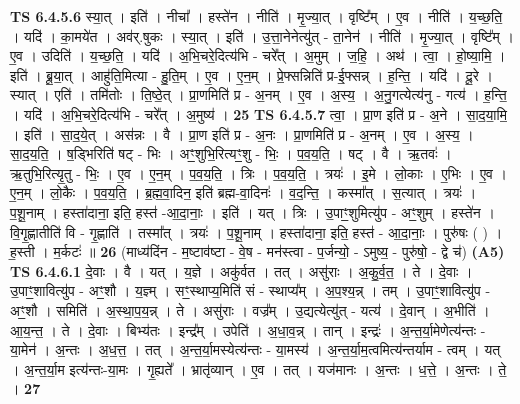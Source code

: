 \documentclass[17pt]{extarticle}
\begin{document}
                  \newline
                                \textbf{ TS 6.4.5.6} \newline
                  स्या॒त् । इति॑ । नीचा᳚ । हस्ते॑न । नीति॑ । मृ॒ज्या॒त् । वृष्टि᳚म् । ए॒व । नीति॑ । य॒च्छ॒ति॒ । यदि॑ । का॒मये॑त । अव॑र्.षुकः । स्या॒त् । इति॑ । उ॒त्ता॒नेनेत्यु॑त् - ता॒नेन॑ । नीति॑ । मृ॒ज्या॒त् । वृष्टि᳚म् । ए॒व । उदिति॑ । य॒च्छ॒ति॒ । यदि॑ । अ॒भि॒चरे॒दित्य॑भि - चरे᳚त् । अ॒मुम् । ज॒हि॒ । अथ॑ । त्वा॒ । हो॒ष्या॒मि॒ । इति॑ । ब्रू॒या॒त् । आहु॑ति॒मित्या - हु॒ति॒म् । ए॒व । ए॒न॒म् । प्रे॒फ्सन्निति॑ प्र-ई॒फ्सन्न् । ह॒न्ति॒ । यदि॑ । दू॒रे । स्यात् । एति॑ । तमि॑तोः । ति॒ष्ठे॒त् । प्रा॒णमिति॑ प्र - अ॒नम् । ए॒व । अ॒स्य॒ । अ॒नु॒गत्येत्य॑नु - गत्य॑ । ह॒न्ति॒ । यदि॑ । अ॒भि॒चरे॒दित्य॑भि - चरे᳚त् । अ॒मुष्य॑ । \textbf{  25} \newline
                  \newline
                                \textbf{ TS 6.4.5.7} \newline
                  त्वा॒ । प्रा॒ण इति॑ प्र - अ॒ने । सा॒द॒या॒मि॒ । इति॑ । सा॒द॒ये॒त् । अस॑न्नः । वै । प्रा॒ण इति॑ प्र - अ॒नः । प्रा॒णमिति॑ प्र - अ॒नम् । ए॒व । अ॒स्य॒ । सा॒द॒य॒ति॒ । ष॒ड्भिरिति॑ षट् - भिः । अꣳ॒॒शुभि॒रित्यꣳ॒॒शु - भिः॒ । प॒व॒य॒ति॒ । षट् । वै । ऋ॒तवः॑ । ऋ॒तुभि॒रित्यृ॒तु - भिः॒ । ए॒व । ए॒न॒म् । प॒व॒य॒ति॒ । त्रिः । प॒व॒य॒ति॒ । त्रयः॑ । इ॒मे । लो॒काः । ए॒भिः । ए॒व । ए॒न॒म् । लो॒कैः । प॒व॒य॒ति॒ । ब्र॒ह्म॒वा॒दिन॒ इति॑ ब्रह्म-वा॒दिनः॑ । व॒द॒न्ति॒ । कस्मा᳚त् । स॒त्यात् । त्रयः॑ । प॒शू॒नाम् । हस्ता॑दाना॒ इति॒ हस्त॑ -आ॒दा॒नाः॒ । इति॑ । यत् । त्रिः । उ॒पाꣳ॒॒शुमित्यु॑प - अꣳ॒॒शुम् । हस्ते॑न । वि॒गृ॒ह्णातीति॑ वि - गृ॒ह्णाति॑ । तस्मा᳚त् । त्रयः॑ । प॒शू॒नाम् । हस्ता॑दाना॒ इति॒ हस्त॑ - आ॒दा॒नाः॒ । पुरु॑षः ( ) । ह॒स्ती । म॒र्कटः॑ ॥ \textbf{  26 } \newline
                  \newline
                      (माध्य॑दिंन - म॒ष्टाव॑ष्टा - वे॒ष - मन॑स्त्वा - प॒र्जन्यो॒ - ऽमुष्य॒ - पुरु॑षो॒ - द्वे च॑)  \textbf{(A5)} \newline \newline
                                \textbf{ TS 6.4.6.1} \newline
                  दे॒वाः । वै । यत् । य॒ज्ञे । अकु॑र्वत । तत् । असु॑राः । अ॒कु॒र्व॒त॒ । ते । दे॒वाः । उ॒पाꣳ॒॒शावित्यु॑प - अꣳ॒॒शौ । य॒ज्ञ्म् । सꣳ॒॒स्थाप्य॒मिति॑ सं - स्थाप्य᳚म् । अ॒प॒श्य॒न्न् । तम् । उ॒पाꣳ॒॒शावित्यु॑प - अꣳ॒॒शौ । समिति॑ । अ॒स्था॒प॒य॒न्न् । ते । असु॑राः । वज्र᳚म् । उ॒द्यत्येत्यु॑त् - यत्य॑ । दे॒वान् । अ॒भीति॑ । आ॒य॒न्त॒ । ते । दे॒वाः । बिभ्य॑तः । इन्द्र᳚म् । उपेति॑ । अ॒धा॒व॒न्न् । तान् । इन्द्रः॑ । अ॒न्त॒र्या॒मेणेत्य॑न्तः - या॒मेन॑ । अ॒न्तः । अ॒ध॒त्त॒ । तत् । अ॒न्त॒र्या॒मस्येत्य॑न्तः - या॒मस्य॑ । अ॒न्त॒र्या॒म॒त्वमित्य॑न्तर्याम - त्वम् । यत् । अ॒न्त॒र्या॒म इत्य॑न्तः-या॒मः । गृ॒ह्यते᳚ । भ्रातृ॑व्यान् । ए॒व । तत् । यज॑मानः । अ॒न्तः । ध॒त्ते॒ । अ॒न्तः । ते॒ । \textbf{  27} \newline
\end{document}
